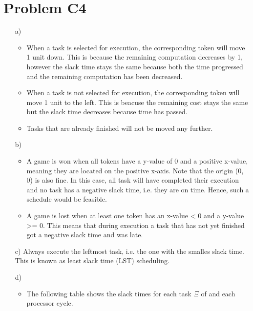 \documentclass[12pt]{article}
\begin{document}
\section*{Problem C4}
\begin{itemize}
\item[a)] 
	\begin{itemize}
	\item When a task is selected for execution, the corresponding token will move 1 unit down. This is because the remaining computation decreases by 1, however the slack time stays the same because both the time progressed and the remaining computation has been decreased. 
	\item When a task is not selected for execution, the corresponding token will move 1 unit to the left. This is beacuse the remaining cost stays the same but the slack time decreases because time has passed.
	\item Tasks that are already finished will not be moved any further.
	\end{itemize}
	
\item[b)] 
	\begin{itemize}
	\item A game is won when all tokens have a y-value of 0 and a positive x-value, meaning they are located on the positive x-axis. Note that the origin (0, 0) is also fine. In this case, all task will have completed their execution and no task has a negative slack time, i.e. they are on time. Hence, such a schedule would be feasible.
	\item A game is lost when at least one token has an x-value < 0 and a y-value >= 0. This means that during execution a task that has not yet finished got a negative slack time and was late. 
	\end{itemize}
	
\item[c)] Always execute the leftmost task, i.e. the one with the smalles slack time.  This is known as least slack time (LST) scheduling.

\item[d)] \begin{itemize}
	\item The following table shows the slack times for each task $\Xi$ of  and each processor cycle.
	

\end{itemize}
\end{itemize}
\end{document}
